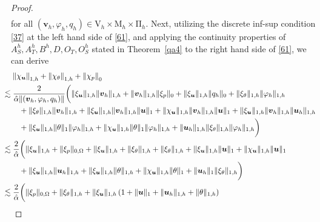 \documentclass[10pt,a4paper]{article}
\begin{document}
\begin{proof}
\begin{align}
\end{align}
for all $\left( \boldsymbol{v}_h,\varphi_h,q_h\right) \in \mathrm{V}_h \times \mathrm{M}_h \times \mathrm{\Pi}_h$. Next, utilizing the discrete inf-sup condition \eqref{37} at the left hand side of \eqref{61}, and applying the continuity properties of $A_S^h, A_T^h, B^h, D, O_T, O_S^h$ stated in Theorem~\ref{qa4} to the right hand side of \eqref{61}, we can derive
   \begin{align*}
  & \left\|\chi_{\boldsymbol{u}}\right\|_{1,h} +   \left\|\chi_{\theta}\right\|_{1,h} + \left\|\chi_p\right\|_{0} \\
  & \hspace{-4mm} \lesssim \frac{2}{\hat{\alpha} \| (\boldsymbol{v}_h, \varphi_h, q_h) \|} \bigg( \|\xi_{\boldsymbol{u}}\|_{1,h} \|\boldsymbol{v}_h\|_{1,h} + \|\boldsymbol{v}_h\|_{1,h} \| \xi_p\|_{0} + \|\xi_{\boldsymbol{u}}\|_{1,h} \|q_h\|_{0} + \| \xi_{\theta}\|_{1,h} \| \varphi_h \|_{1,h} \\& \quad + \| \xi_{\theta} \|_{1,h}   \|\boldsymbol{v}_h\|_{1,h}  + \|\xi_{\boldsymbol{u}}\|_{1,h} \|\boldsymbol{v}_h\|_{1,h} \| \boldsymbol{u} \|_{1}  + \|\chi_{\boldsymbol{u}}\|_{1,h} \|\boldsymbol{v}_h\|_{1,h} \| \boldsymbol{u} \|_{1}  + \|\xi_{\boldsymbol{u}}\|_{1,h} \|\boldsymbol{v}_h\|_{1,h} \| \boldsymbol{u}_h \|_{1,h} \\
  &\quad  + \| \xi_{\boldsymbol{u}} \|_{1,h} \| \theta \|_{1} \| \varphi_h \|_{1,h} + \| \chi_{\boldsymbol{u}} \|_{1,h} \| \theta \|_{1} \| \varphi_h \|_{1,h} + \| \boldsymbol{u}_h \|_{1,h} \| \xi_{\theta} \|_{1,h} \| \varphi_h \|_{1,h} \bigg)  \\      
  & \hspace{-4mm} \lesssim \frac{2}{\hat{\alpha}} \bigg( \|\xi_{\boldsymbol{u}}\|_{1,h}  +  \| \xi_p\|_{0,\Omega} + \|\xi_{\boldsymbol{u}}\|_{1,h} + \| \xi_{\theta}\|_{1,h} + \| \xi_{\theta} \|_{1,h}  + \|\xi_{\boldsymbol{u}}\|_{1,h} \| \boldsymbol{u} \|_{1} + \|\chi_{\boldsymbol{u}}\|_{1,h} \| \boldsymbol{u} \|_{1}  \\
  &\quad  + \|\xi_{\boldsymbol{u}}\|_{1,h} \| \boldsymbol{u}_h \|_{1,h}  + \| \xi_{\boldsymbol{u}} \|_{1,h} \| \theta \|_{1,h}  + \| \chi_{\boldsymbol{u}} \|_{1,h} \| \theta \|_{1} + \| \boldsymbol{u}_h \|_{1} \| \xi_{\theta} \|_{1,h}  \bigg) \\
  & \hspace{-4mm} \lesssim \frac{2}{\hat{\alpha}} \bigg(  \| \xi_p\|_{0,\Omega} + \| \xi_{\theta} \|_{1,h} + \|\xi_{\boldsymbol{u}}\|_{1,h} \left( 1+ \| \boldsymbol{u} \|_{1} + \| \boldsymbol{u}_h \|_{1,h} +  \| \theta \|_{1,h} \right)  \\

\end{align*}
\end{proof}
\end{document}
